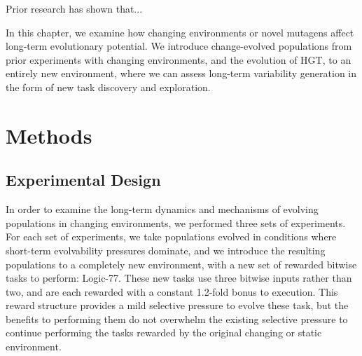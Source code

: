 \documentclass[PhD]{msu-thesis}
\begin{document}
Prior research has shown that...


In this chapter, we examine how changing environments or novel mutagens
affect long-term evolutionary potential. We introduce change-evolved populations from prior experiments with changing environments, and the evolution of HGT,
to an entirely new environment, where we can assess long-term variability generation in the form of new task discovery and exploration.

\section{Methods}

\subsection{Experimental Design}
In order to examine the long-term dynamics and mechanisms of evolving populations in changing environments, we performed three sets of experiments. For each set of experiments, we take 
populations evolved in conditions where short-term evolvability pressures dominate, and we introduce the resulting populations to a completely new environment, with a new set of rewarded bitwise tasks to perform: Logic-77. These new tasks use 
three bitwise inputs rather than 
two, and are each rewarded with a constant 1.2-fold bonus to execution. This reward structure provides a mild selective pressure to evolve these task, but the benefits to performing them do not overwhelm the existing selective pressure to continue performing the tasks rewarded by the original changing or static environment. 
\end{document}

